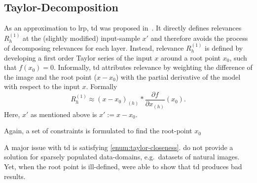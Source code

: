 \subsection{Taylor-Decomposition}\label{subsect:td}
As an approximation to \gls{lrp}, \gls{td} was proposed in~\cite{Bach.2015}. It directly defines relevances \(R_{h}^{(1)}\) at the (slightly modified) input-sample \(x'\) and therefore avoids the process of decomposing relevances for each layer. Instead, relevance \(R_{h}^{(1)}\) is defined by developing a first order Taylor series of the input \(x\) around a root point \(x_0\), such that \(f(x_0) = 0\). Informally, \gls{td} attributes relevance by weighting the difference of the image and the root point (\(x-x_0\)) with the partial derivative of the model with respect to the input \(x\). Formally
\begin{equation}
    R_{h}^{(1)} \approx (x-x_0)_{(h)} * \frac{\partial f}{\partial x_{(h)}}(x_0).
\end{equation}
Here, \(x'\) as mentioned above is \(x':=x-x_0\).
\par
Again, a set of constraints is formulated to find the root-point \(x_0\)
A major issue with \gls{td} is satisfying \cref{enum:taylor-closeness}.  do not provide a solution for sparsely populated data-domains, e.g.\ datasets of natural images. Yet, when the root point is ill-defined,  were able to show that \gls{td} produces bad results.


